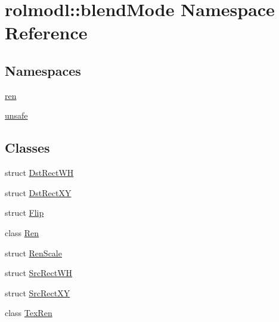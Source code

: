 \hypertarget{namespacerolmodl_1_1blend_mode}{}\section{rolmodl\+::blend\+Mode Namespace Reference}
\label{namespacerolmodl_1_1blend_mode}
\subsection*{Namespaces}
\begin{DoxyCompactItemize}
\item 
 \mbox{\hyperlink{namespacerolmodl_1_1blend_mode_1_1ren}{ren}}
\item 
 \mbox{\hyperlink{namespacerolmodl_1_1blend_mode_1_1unsafe}{unsafe}}
\end{DoxyCompactItemize}
\subsection*{Classes}
\begin{DoxyCompactItemize}
\item 
struct \mbox{\hyperlink{structrolmodl_1_1blend_mode_1_1_dst_rect_w_h}{Dst\+Rect\+WH}}
\item 
struct \mbox{\hyperlink{structrolmodl_1_1blend_mode_1_1_dst_rect_x_y}{Dst\+Rect\+XY}}
\item 
struct \mbox{\hyperlink{structrolmodl_1_1blend_mode_1_1_flip}{Flip}}
\item 
class \mbox{\hyperlink{classrolmodl_1_1blend_mode_1_1_ren}{Ren}}
\item 
struct \mbox{\hyperlink{structrolmodl_1_1blend_mode_1_1_ren_scale}{Ren\+Scale}}
\item 
struct \mbox{\hyperlink{structrolmodl_1_1blend_mode_1_1_src_rect_w_h}{Src\+Rect\+WH}}
\item 
struct \mbox{\hyperlink{structrolmodl_1_1blend_mode_1_1_src_rect_x_y}{Src\+Rect\+XY}}
\item 
class \mbox{\hyperlink{classrolmodl_1_1blend_mode_1_1_tex_ren}{Tex\+Ren}}
\end{DoxyCompactItemize}
